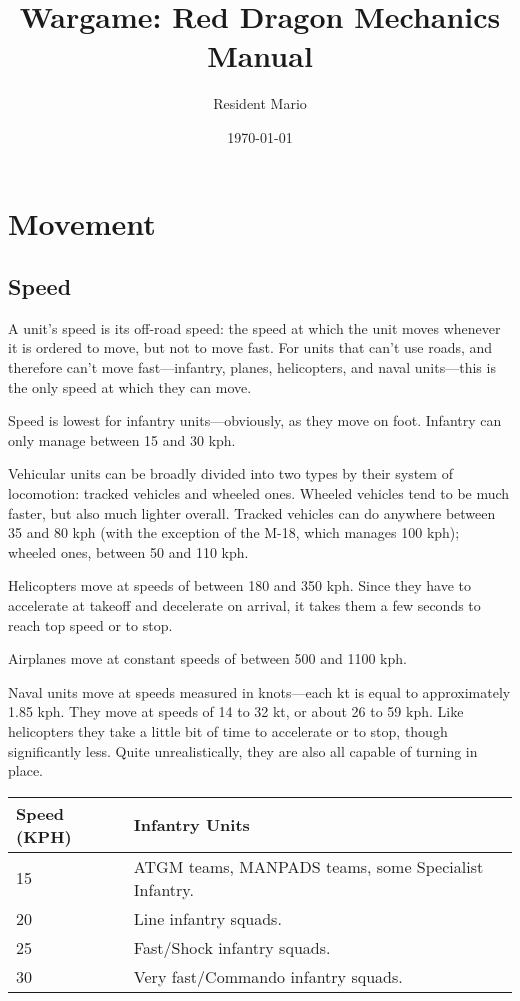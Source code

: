 \documentclass{article}
\begin{document}
\title{Wargame: Red Dragon Mechanics Manual}
\date{\today}
\author{Resident Mario}
\maketitle

\newpage
\tableofcontents
\newpage

\section{Movement}
\subsection{Speed}

A unit's speed is its off-road speed: the speed at which the unit moves whenever
it is ordered to move, but not to move fast. For units that can't use roads,
and therefore can't move fast---infantry, planes, helicopters, and naval
units---this is the only speed at which they can move.

Speed is lowest for infantry units---obviously, as they move on foot. Infantry
can only manage between 15 and 30 kph.

Vehicular units can be broadly divided into two types by their system of
locomotion: tracked vehicles and wheeled ones. Wheeled vehicles tend to be much
faster, but also much lighter overall. Tracked vehicles can do anywhere between
35 and 80 kph (with the exception of the M-18, which manages 100 kph); wheeled
ones, between 50 and 110 kph.

Helicopters move at speeds of between 180 and 350 kph. Since they have to
accelerate at takeoff and decelerate on arrival, it takes them a few seconds to
reach top speed or to stop.

Airplanes move at constant speeds of between 500 and 1100 kph.

Naval units move at speeds measured in knots---each kt is equal to approximately
1.85 kph. They move at speeds of 14 to 32 kt, or about 26 to 59 kph. Like
helicopters they take a little bit of time to accelerate or to stop, though
significantly less. Quite unrealistically, they are also all capable of
turning in place.

\begin{center}
    \begin{tabular}{ | l | p{9cm} | }
    \hline
    Speed (KPH) & Infantry Units \\ \hline
    15 & ATGM teams, MANPADS teams, some Specialist Infantry.  \\ 
    20 & Line infantry squads. \\ 
    25 & Fast/Shock infantry squads. \\ 
    30 & Very fast/Commando infantry squads. \\
    \hline
    \end{tabular}
\end{center}
\end{document}
